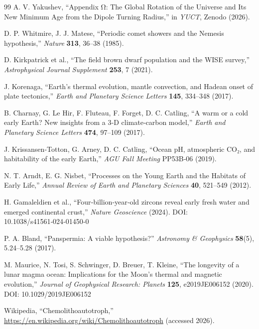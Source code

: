 \documentclass[11pt,a4paper]{article}
\begin{document}
\begin{thebibliography}{99}
		A. V. Yakushev, ``Appendix Ω: The Global Rotation of the Universe and Its New Minimum Age from the Dipole Turning Radius,''
		in \emph{YUCT}, Zenodo (2026).
		
		D. P. Whitmire, J. J. Matese, ``Periodic comet showers and the Nemesis hypothesis,''
		\emph{Nature} \textbf{313}, 36–38 (1985).
		
		D. Kirkpatrick et al., ``The field brown dwarf population and the WISE survey,''
		\emph{Astrophysical Journal Supplement} \textbf{253}, 7 (2021).
		
		J. Korenaga, ``Earth’s thermal evolution, mantle convection, and Hadean onset of plate tectonics,''
		\emph{Earth and Planetary Science Letters} \textbf{145}, 334–348 (2017).
		
		B. Charnay, G. Le Hir, F. Fluteau, F. Forget, D. C. Catling, ``A warm or a cold early Earth? New insights from a 3‑D climate‑carbon model,''
		\emph{Earth and Planetary Science Letters} \textbf{474}, 97–109 (2017).
		
		J. Krissansen‑Totton, G. Arney, D. C. Catling, ``Ocean pH, atmospheric CO₂, and habitability of the early Earth,''
		\emph{AGU Fall Meeting} PP53B‑06 (2019).
		
		N. T. Arndt, E. G. Nisbet, ``Processes on the Young Earth and the Habitats of Early Life,''
		\emph{Annual Review of Earth and Planetary Sciences} \textbf{40}, 521–549 (2012).
		
		H. Gamaleldien et al., ``Four‑billion‑year‑old zircons reveal early fresh water and emerged continental crust,''
		\emph{Nature Geoscience} (2024). DOI: 10.1038/s41561‑024‑01450‑0
		
		P. A. Bland, ``Panspermia: A viable hypothesis?''
		\emph{Astronomy \& Geophysics} \textbf{58}(5), 5.24–5.28 (2017).
		
		M. Maurice, N. Tosi, S. Schwinger, D. Breuer, T. Kleine, ``The longevity of a lunar magma ocean: Implications for the Moon's thermal and magnetic evolution,''
		\emph{Journal of Geophysical Research: Planets} \textbf{125}, e2019JE006152 (2020). DOI: 10.1029/2019JE006152
		
		Wikipedia, ``Chemolithoautotroph,''
		\url{https://en.wikipedia.org/wiki/Chemolithoautotroph} (accessed 2026).
		

\end{thebibliography}
\end{document}
